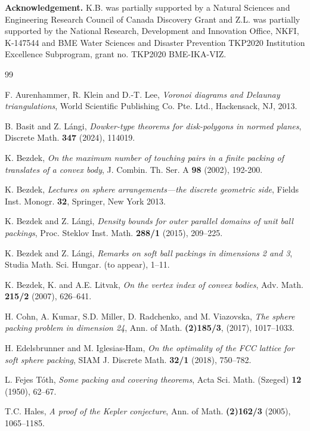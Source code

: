 \documentclass[11pt]{amsart}
\theoremstyle{definition}
\numberwithin{equation}{section}
\begin{document}
\vskip0.5cm
{\bf Acknowledgement.}
{\small
K.B. was partially supported by a Natural Sciences and Engineering Research Council of Canada Discovery Grant and Z.L. was partially supported by the National Research, Development and Innovation Office, NKFI, K-147544 and BME Water Sciences and Disaster Prevention TKP2020 Institution Excellence Subprogram, grant no. TKP2020 BME-IKA-VIZ.
}


\begin{thebibliography}{99}

 F. Aurenhammer, R. Klein and D.-T. Lee, \emph{Voronoi diagrams and Delaunay triangulations}, World Scientific Publishing Co. Pte. Ltd., Hackensack, NJ, 2013.

 B. Basit and Z. L\'angi, \emph{Dowker-type theorems for disk-polygons in normed planes}, Discrete Math. \textbf{347} (2024), 114019.


K. Bezdek, \emph{On the maximum number of touching pairs in a finite packing of translates of a convex body}, J. Combin. Th. Ser. A \textbf{98} (2002), 192-200.


K. Bezdek, \emph{Lectures on sphere arrangements—the discrete geometric side}, Fields Inst. Monogr. \textbf{32}, Springer, New York 2013.


K. Bezdek and Z. L\'angi, \emph{Density bounds for outer parallel domains of unit ball packings}, Proc. Steklov Inst. Math. \textbf{288/1} (2015), 209--225.


K. Bezdek and Z. L\'angi, \emph{Remarks on soft ball packings in dimensions 2 and 3}, Studia Math. Sci. Hungar. (to appear), 1--11.

K. Bezdek, K. and A.E. Litvak, \emph{On the vertex index of convex bodies}, Adv. Math. \textbf{215/2} (2007), 626--641.


H. Cohn, A. Kumar, S.D. Miller, D. Radchenko, and M. Viazovska, \emph{The sphere packing problem in dimension 24}, Ann. of Math. \textbf{(2)185/3}, (2017), 1017--1033.


H. Edelsbrunner and M. Iglesias-Ham, \emph{On the optimality of the FCC lattice for soft sphere packing}, SIAM J. Discrete Math. \textbf{32/1} (2018), 750--782.


L. Fejes T\'oth, \emph{Some packing and covering theorems}, Acta Sci. Math. (Szeged) \textbf{12} (1950), 62--67.

T.C. Hales, \emph{A proof of the Kepler conjecture}, Ann. of Math. \textbf{(2)162/3} (2005), 1065--1185.


\end{thebibliography}
\end{document}
